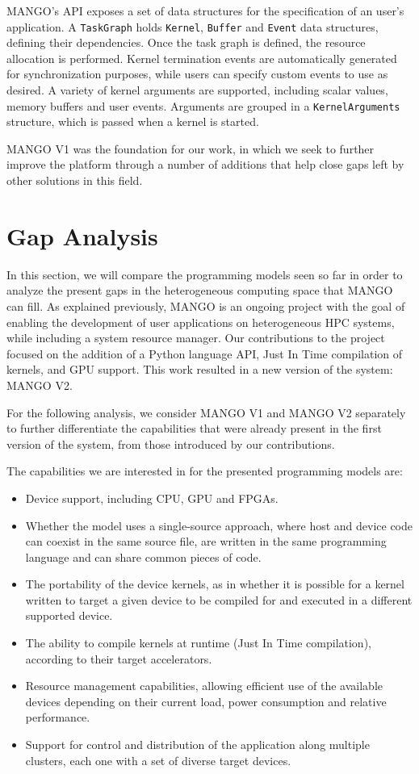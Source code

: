 MANGO's API exposes a set of data structures for the specification of an user's application. A \texttt{TaskGraph} holds \texttt{Kernel}, \texttt{Buffer} and \texttt{Event} data structures, defining their dependencies. 
Once the task graph is defined, the resource allocation is performed.
Kernel termination events are automatically generated for synchronization purposes, while users can specify custom events to use as desired.
A variety of kernel arguments are supported, including scalar values, memory buffers and user events. Arguments are grouped in a \texttt{KernelArguments} structure, which is passed when a kernel is started.

MANGO V1 was the foundation for our work, in which we seek to further improve the platform through a number of additions that help close gaps left by other solutions in this field.

\section{Gap Analysis}

In this section, we will compare the programming models seen so far in order to analyze the present gaps in the heterogeneous computing space that MANGO can fill.
As explained previously, MANGO is an ongoing project with the goal of enabling the development of user applications on heterogeneous HPC systems, while including a system resource manager. 
Our contributions to the project focused on the addition of a Python language API, Just In Time compilation of kernels, and GPU support.
This work resulted in a new version of the system: MANGO V2.

For the following analysis, we consider MANGO V1 and MANGO V2 separately to further differentiate the capabilities that were already present in the first version of the system, from those introduced by our contributions.

The capabilities we are interested in for the presented programming models are:

\begin{itemize}
    \item Device support, including CPU, GPU and FPGAs.
    \item Whether the model uses a single-source approach, where host and device code can coexist in the same source file, are written in the same programming language and can share common pieces of code.
    \item The portability of the device kernels, as in whether it is possible for a kernel written to target a given device to be compiled for and executed in a different supported device.
    \item The ability to compile kernels at runtime (Just In Time compilation), according to their target accelerators.
    \item Resource management capabilities, allowing efficient use of the available devices depending on their current load, power consumption and relative performance.
    \item Support for control and distribution of the application along multiple clusters, each one with a set of diverse target devices.
\end{itemize}

